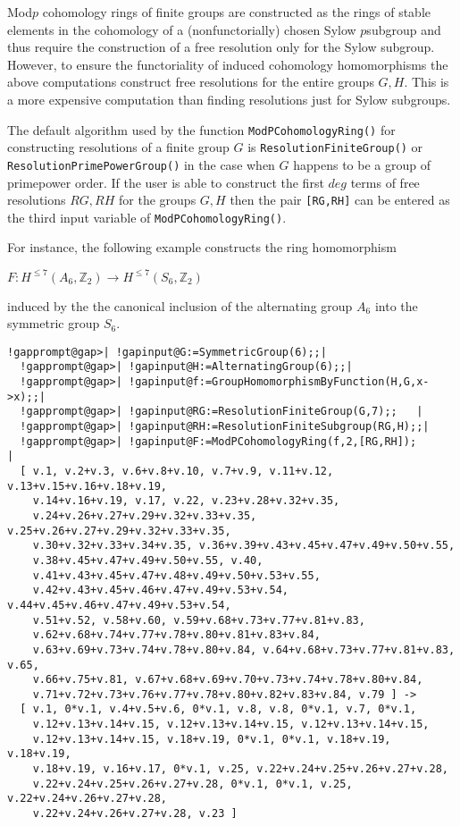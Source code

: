 \documentclass[a4paper,11pt]{report}
\begin{document}
{{{Mod\texttt{}$p$ cohomology rings of finite groups are constructed as the rings of stable
elements in the cohomology of a (non\texttt{}functorially) chosen
Sylow $p$\texttt{}subgroup and thus require the construction of a free
resolution only for the Sylow subgroup. However, to ensure the functoriality
of induced cohomology homomorphisms the above computations construct free
resolutions for the entire groups $G,H$. This is a more expensive computation than finding resolutions just for Sylow
subgroups. 

The default algorithm used by the function \texttt{ModPCohomologyRing()} for constructing resolutions of a finite group $G$ is \texttt{ResolutionFiniteGroup()} or \texttt{ResolutionPrimePowerGroup()} in the case when $G$ happens to be a group of prime\texttt{}power order. If the user is
able to construct the first $deg$ terms of free resolutions $RG, RH$ for the groups $G, H$ then the pair \texttt{[RG,RH]} can be entered as the third input variable of \texttt{ModPCohomologyRing()}. 

For instance, the following example constructs the ring homomorphism 

$F\colon H^{\le 7}(A_6,\mathbb Z_2) \rightarrow H^{\le 7}(S_6,\mathbb Z_2)$ 

 induced by the the canonical inclusion of the alternating group $A_6$ into the symmetric group $S_6$. 
\begin{Verbatim}[commandchars=!@|,fontsize=\small,frame=single,label=Example]
  !gapprompt@gap>| !gapinput@G:=SymmetricGroup(6);;|
  !gapprompt@gap>| !gapinput@H:=AlternatingGroup(6);;|
  !gapprompt@gap>| !gapinput@f:=GroupHomomorphismByFunction(H,G,x->x);;|
  !gapprompt@gap>| !gapinput@RG:=ResolutionFiniteGroup(G,7);;   |
  !gapprompt@gap>| !gapinput@RH:=ResolutionFiniteSubgroup(RG,H);;|
  !gapprompt@gap>| !gapinput@F:=ModPCohomologyRing(f,2,[RG,RH]);       |
  [ v.1, v.2+v.3, v.6+v.8+v.10, v.7+v.9, v.11+v.12, v.13+v.15+v.16+v.18+v.19, 
    v.14+v.16+v.19, v.17, v.22, v.23+v.28+v.32+v.35, 
    v.24+v.26+v.27+v.29+v.32+v.33+v.35, v.25+v.26+v.27+v.29+v.32+v.33+v.35, 
    v.30+v.32+v.33+v.34+v.35, v.36+v.39+v.43+v.45+v.47+v.49+v.50+v.55, 
    v.38+v.45+v.47+v.49+v.50+v.55, v.40, 
    v.41+v.43+v.45+v.47+v.48+v.49+v.50+v.53+v.55, 
    v.42+v.43+v.45+v.46+v.47+v.49+v.53+v.54, v.44+v.45+v.46+v.47+v.49+v.53+v.54,
    v.51+v.52, v.58+v.60, v.59+v.68+v.73+v.77+v.81+v.83, 
    v.62+v.68+v.74+v.77+v.78+v.80+v.81+v.83+v.84, 
    v.63+v.69+v.73+v.74+v.78+v.80+v.84, v.64+v.68+v.73+v.77+v.81+v.83, v.65, 
    v.66+v.75+v.81, v.67+v.68+v.69+v.70+v.73+v.74+v.78+v.80+v.84, 
    v.71+v.72+v.73+v.76+v.77+v.78+v.80+v.82+v.83+v.84, v.79 ] -> 
  [ v.1, 0*v.1, v.4+v.5+v.6, 0*v.1, v.8, v.8, 0*v.1, v.7, 0*v.1, 
    v.12+v.13+v.14+v.15, v.12+v.13+v.14+v.15, v.12+v.13+v.14+v.15, 
    v.12+v.13+v.14+v.15, v.18+v.19, 0*v.1, 0*v.1, v.18+v.19, v.18+v.19, 
    v.18+v.19, v.16+v.17, 0*v.1, v.25, v.22+v.24+v.25+v.26+v.27+v.28, 
    v.22+v.24+v.25+v.26+v.27+v.28, 0*v.1, 0*v.1, v.25, v.22+v.24+v.26+v.27+v.28,
    v.22+v.24+v.26+v.27+v.28, v.23 ]
  

\end{Verbatim}}}}
\end{document}
